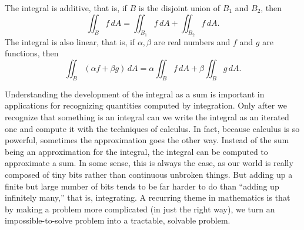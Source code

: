 \documentclass[12pt]{article}
\begin{document}
The integral is additive, that is, if $B$ is the disjoint union of $B_1$ and $B_2$,
then
\[
\iint_B f \, dA = 
\iint_{B_1} f \, dA +
\iint_{B_2} f \, dA .
\]
The integral is also linear, that is, if $\alpha, \beta$ are real numbers and
$f$ and $g$ are functions, then
\[
\iint_B (\alpha f + \beta g) \, dA = 
\alpha \iint_B f \, dA +
\beta \iint_B g \, dA .
\]

Understanding the development of the integral as a sum is important
in applications for recognizing quantities computed by integration.
Only after we recognize that something is an integral can we write the integral as an iterated
one and compute it with the techniques of calculus.
In fact, because calculus is
so powerful, sometimes the approximation goes the other way.
Instead of the sum being an approximation for the integral, the integral can be
computed to approximate a sum.
In some sense, this is always the case, as our world is
really composed of tiny bits rather than continuous unbroken things.
But adding up a finite but large number of bits tends to be far harder to do than
``adding up infinitely many,'' that is, integrating.
A recurring theme in mathematics is that by making a problem more complicated
(in just the right way), we turn an impossible-to-solve problem
into a tractable, solvable problem.
\end{document}
